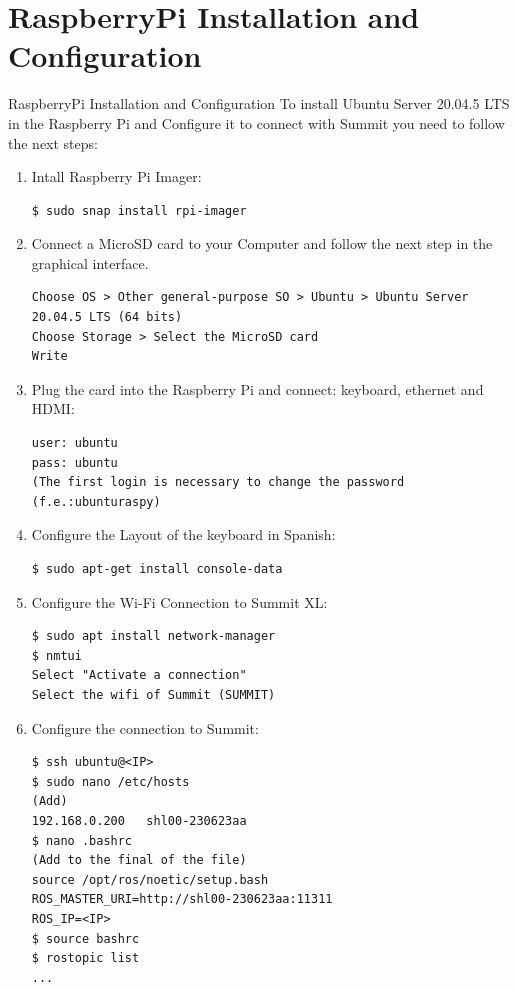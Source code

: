 
\section{RaspberryPi Installation and Configuration}
\begin{frame}{RaspberryPi Installation and Configuration}
To install Ubuntu Server 20.04.5 LTS in the Raspberry Pi and Configure it to connect with Summit you need to follow the next steps:

\begin{enumerate}
    \item Intall Raspberry Pi Imager:
\begin{lstlisting}[language=shell]
$ sudo snap install rpi-imager
\end{lstlisting}
    \item Connect a MicroSD card to your Computer and follow the next step in the graphical interface.
\begin{lstlisting}[language=shell]
Choose OS > Other general-purpose SO > Ubuntu > Ubuntu Server 20.04.5 LTS (64 bits)
Choose Storage > Select the MicroSD card
Write
\end{lstlisting}
    \item Plug the card into the Raspberry Pi and connect: keyboard, ethernet and HDMI:
\begin{lstlisting}[language=shell]
user: ubuntu
pass: ubuntu
(The first login is necessary to change the password (f.e.:ubunturaspy)
\end{lstlisting}
    \item Configure the Layout of the keyboard in Spanish: 
\begin{lstlisting}[language=shell]
$ sudo apt-get install console-data
\end{lstlisting}
    \item Configure the Wi-Fi Connection to Summit XL:
\begin{lstlisting}[language=shell]
$ sudo apt install network-manager
$ nmtui
Select "Activate a connection"
Select the wifi of Summit (SUMMIT)
\end{lstlisting}
    \item Configure the connection to Summit:
\begin{lstlisting}[language=shell]
$ ssh ubuntu@<IP>
$ sudo nano /etc/hosts
(Add)
192.168.0.200   shl00-230623aa
$ nano .bashrc
(Add to the final of the file)
source /opt/ros/noetic/setup.bash
ROS_MASTER_URI=http://shl00-230623aa:11311
ROS_IP=<IP>
$ source bashrc
$ rostopic list
...
\end{lstlisting}    

\end{enumerate}
\end{frame}
